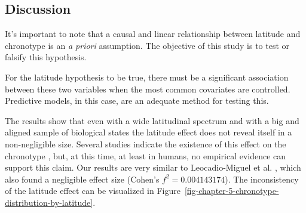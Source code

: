 \documentclass[
12pt,
openright,
oneside,
a4paper,
chapter=TITLE,
section=TITLE,
french,
spanish,
brazil,
english
]{abntex2}\usepackage{array}
\begin{document}
\subsection{Discussion}\label{discussion}

It's important to note that a causal and linear relationship between
latitude and chronotype is an \emph{a priori} assumption. The objective
of this study is to test or falsify this hypothesis.

For the latitude hypothesis to be true, there must be a significant
association between these two variables when the most common covariates
are controlled. Predictive models, in this case, are an adequate method
for testing this.

The results show that even with a wide latitudinal spectrum and with a
big and aligned sample of biological states the latitude effect does not
reveal itself in a non-negligible size. Several studies indicate the
existence of this effect on the chronotype
\autocite{hut2013,leocadio-miguel2017,pittendrigh1991,randler2008,randler2017,roenneberg2003},
but, at this time, at least in humans, no empirical evidence can support
this claim. Our results are very similar to Leocadio-Miguel et al.
\autocite*{leocadio-miguel2017}, which also found a negligible effect
size (Cohen's \(f^{2} = 0.004143174\)). The inconsistency of the
latitude effect can be visualized in
Figure~\ref{fig-chapter-5-chronotype-distribution-by-latitude}.
\end{document}
